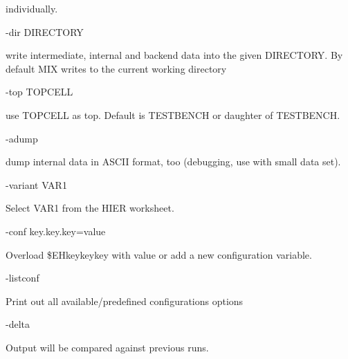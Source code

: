 \documentclass[a4paper,12pt]{article}
\begin{document}
\hspace*{15mm}individually.\newline
\begin{tt}-dir DIRECTORY\end{tt}\newline
\hspace*{15mm}write intermediate, internal and backend data into the given\newline
\hspace*{15mm}DIRECTORY. By default MIX writes to the current working directory\newline
\begin{tt}-top TOPCELL\end{tt}\newline
\hspace*{15mm}use TOPCELL as top. Default is TESTBENCH or daughter of TESTBENCH.\newline
\begin{tt}-adump\end{tt}\newline
\hspace*{15mm}dump internal data in ASCII format, too\newline
\hspace*{15mm}(debugging, use with small data set).\newline
\begin{tt}-variant VAR1\end{tt}
\hspace*{15mm}Select VAR1 from the HIER worksheet.\newline
\begin{tt}-conf key.key.key=value\end{tt}\newline
\hspace*{15mm}Overload \$EH{key}{key}{key} with value or add a\newline
\hspace*{15mm}new configuration variable.\newline
\begin{tt}-listconf\end{tt}\newline
\hspace*{15mm}Print out all available/predefined configurations options\newline
\begin{tt}-delta\end{tt}\newline
\hspace*{15mm}Output will be compared against previous runs.\newline
\end{document}
